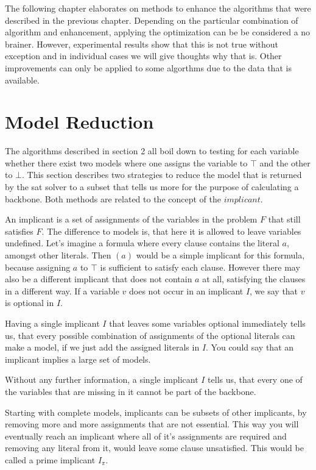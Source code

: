 
The following chapter elaborates on methods to enhance the algorithms that were described in the previous chapter. Depending on the particular combination of algorithm and enhancement, applying the optimization can be be considered a no brainer. However, experimental results show that this is not true without exception and in individual cases we will give thoughts why that is. Other improvements can only be applied to some algorthms due to the data that is available.

\section{Model Reduction}

The algorithms described in section 2 all boil down to testing for each variable whether there exist two models where one assigns the variable to $\top$ and the other to $\bot$. This section describes two strategies to reduce the model that is returned by the sat solver to a subset that tells us more for the purpose of calculating a backbone. Both methods are related to the concept of the $implicant$.

An implicant is a set of assignments of the variables in the problem $F$ that still satisfies $F$. The difference to models is, that here it is allowed to leave variables undefined. Let's imagine a formula where every clause contains the literal $a$, amongst other literals. Then $(a)$ would be a simple implicant for this formula, because assigning $a$ to $\top$ is sufficient to satisfy each clause. However there may also be a different implicant that does not contain $a$ at all, satisfying the clauses in a different way. If a variable $v$ does not occur in an implicant $I$, we say that $v$ is optional in $I$.

Having a single implicant $I$ that leaves some variables optional immediately tells us, that every possible combination of assignments of the optional literals can make a model, if we just add the assigned literals in $I$. You could say that an implicant implies a large set of models.

Without any further information, a single implicant $I$ tells us, that every one of the variables that are missing in it cannot be part of the backbone.

Starting with complete models, implicants can be subsets of other implicants, by removing more and more assignments that are not essential. This way you will eventually reach an implicant where all of it's assignments are required and removing any literal from it, would leave some clause unsatisfied. This would be called a prime implicant $I_\pi$.

